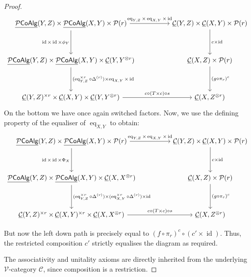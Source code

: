 \documentclass[10pt,a4paper]{amsart}
\newcommand{\C}{\mathcal C}
\def\P{\mathcal P}
\def\Pcoalg{\P\mathsf{CoAlg}}
\newcommand{\V}{\mathcal V}
\newcommand{\eq}{\operatorname{eq}}
\def\id{\operatorname{id}}
\newcommand{\uC}{\underline{\C}}
\newcommand{\uPcoalg}{\underline{\Pcoalg}}
\begin{document}
\begin{proof}
$$
\begin{tikzcd}[column sep=huge, row sep=huge]
\uPcoalg(Y, Z) \times \uPcoalg(X, Y) \times \P(r)
    \arrow[r, "\eq_{Y,Z} \times \eq_{X,Y} \times \id"]
    \arrow[d, "\id \times \id \times \phi_Y"']
& \uC(Y, Z) \times \uC(X, Y) \times \P(r)
    \arrow[d, "c \times \id"]
\\
\uPcoalg(Y, Z) \times \uPcoalg(X, Y) \times \uC(Y, Y^{\otimes r})
     \arrow[d, "(\eq_{Y,Z}^{\times r}\circ \Delta^{(r)}) \times \eq_{X,Y} \times \id"]
& \uC(X, Z) \times \P(r)
    \arrow[d, "(g \circ \pi_r)^c"] 
\\
\uC(Y, Z)^{\times r} \times \uC(X, Y) \times \uC(Y, Y^{\otimes r}) 
 \arrow[r, "c \circ (T \times c)\circ s"]
& \uC(X, Z^{\otimes r})
\end{tikzcd}
$$
On the bottom we have once again switched factors. Now, we use the defining property of the equaliser of $\eq_{X,Y}$ to obtain:
$$
\begin{tikzcd}[column sep=huge, row sep=huge]
\uPcoalg(Y, Z) \times \uPcoalg(X, Y) \times \P(r)
    \arrow[r, "\eq_{Y,Z} \times \eq_{X,Y} \times \id"]
    \arrow[d, "\id \times \id \times \Phi_X"']
& \uC(Y, Z) \times \uC(X, Y) \times \P(r)
    \arrow[d, "c \times \id"]
\\
\uPcoalg(Y, Z) \times \uPcoalg(X, Y) \times \uC(X, X^{\otimes r})
     \arrow[d, "(\eq_{Y,Z}^{\times r}\circ \Delta^{(r)}) \times (\eq_{X,Y}^{\times r}\circ \Delta^{(r)} ) \times \id"]
& \uC(X, Z) \times \P(r)
    \arrow[d, "(g \circ \pi_r)^c"] 
\\
\uC(Y, Z)^{\times r} \times \uC(X, Y)^{\times r} \times \uC(X, X^{\otimes r}) 
 \arrow[r, "c \circ (T \times c)\circ s"]
& \uC(X, Z^{\otimes r})
\end{tikzcd}
$$



But now the left down path is precisely equal to $(f \circ \pi_r)^c \circ (c'\times \id)$. Thus, the restricted composition $c'$ strictly equalises the diagram as required.


The associativity and unitality axioms are directly inherited from the underlying $\V$-category $\C$, since composition is a restriction.    
\end{proof}
\end{document}
